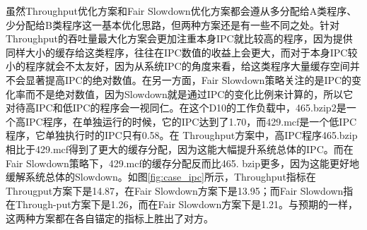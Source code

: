 虽然Throughput优化方案和Fair Slowdown优化方案都会遵从多分配给A类程序、少分配给B类程序这一基本优化思路，但两种方案还是有一些不同之处。针对Throughput的吞吐量最大化方案会更加注重本身IPC就比较高的程序，因为提供同样大小的缓存给这类程序，往往在IPC数值的收益上会更大，而对于本身IPC较小的程序就会不太友好，因为从系统IPC的角度来看，给这类程序大量缓存空间并不会显著提高IPC的绝对数值。在另一方面，Fair Slowdown策略关注的是IPC的变化率而不是绝对数值，因为Slowdown就是通过IPC的变化比例来计算的，所以它对待高IPC和低IPC的程序会一视同仁。在这个D10的工作负载中，465.bzip2是一个高IPC程序，在单独运行的时候，它的IPC达到了1.70，而429.mcf是一个低IPC程序，它单独执行时的IPC只有0.58。在 Throughput方案中，高IPC程序465.bzip相比于429.mcf得到了更大的缓存分配，因为这能大幅提升系统总体的IPC。而在Fair Slowdown策略下，429.mcf的缓存分配反而比465. bzip更多，因为这能更好地缓解系统总体的Slowdown。如图\ref{fig:case_ipc}所示，Throughput指标在Througput方案下是14.87，在Fair Slowdown方案下是13.95；而Fair Slowdown指在Through-put方案下是1.26，而在Fair Slowdown方案下是1.21。与预期的一样，这两种方案都在各自锚定的指标上胜出了对方。